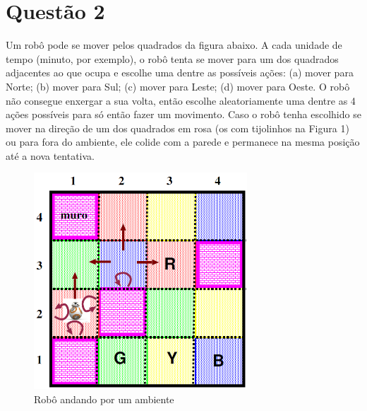 \section*{Questão 2}

Um robô pode se mover pelos quadrados da figura abaixo. A cada unidade de tempo (minuto, por exemplo), o robô tenta se mover para um dos quadrados adjacentes ao que ocupa e escolhe uma dentre as possíveis ações: (a) mover para Norte; (b) mover para Sul; (c) mover para Leste; (d) mover para Oeste. O robô não consegue enxergar a sua volta, então escolhe aleatoriamente uma dentre as 4 ações possíveis para só então fazer um movimento. Caso o robô tenha escolhido se mover na direção de um dos quadrados em rosa (os com tijolinhos na Figura 1) ou para fora do ambiente, ele colide com a parede e permanece na mesma posição até a nova tentativa.

\begin{figure}[H]
    \centering
    \includegraphics[width=8cm]{fig/enunciado_q2.png}
    \caption{Robô andando por um ambiente}
\end{figure}

